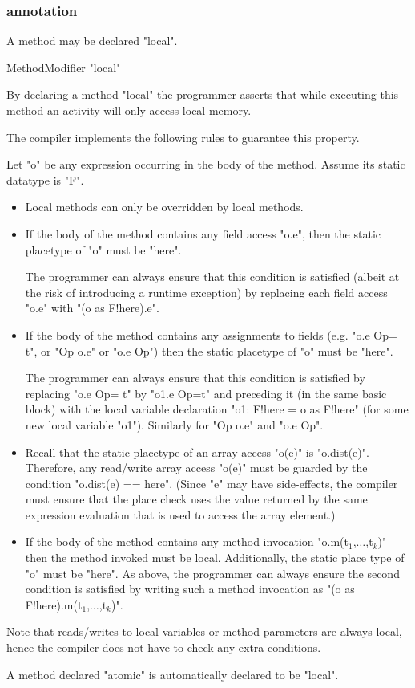 \subsubsection{ annotation}\label{LocalAnnotation}

A method may be declared \xcd"local".

\begin{grammar}
  MethodModifier \: \xcd"local"  
\end{grammar}

By declaring a method \xcd"local" the programmer asserts that while
executing this method an activity will only access local memory.

The compiler implements the following rules to guarantee this property.

Let \xcd"o" be any expression occurring in the body of the
method. Assume its static datatype is \xcd"F". 

\begin{itemize}
\item Local methods can only be overridden by local methods. 

\item If the body of the method contains any field access \xcd"o.e", then
the static placetype of \xcd"o" must be \xcd"here". 

The programmer can always ensure that this condition is satisfied
(albeit at the risk of introducing a runtime exception) by replacing
each field access \xcd"o.e" with \xcd"(o as F!here).e".

\item If the body of the method contains any assignments to fields
(e.g. \xcd"o.e Op= t", or \xcd"Op o.e" or \xcd"o.e Op") then the
static placetype of \xcd"o" must be \xcd"here".

The programmer can always ensure that this condition is satisfied by
replacing \xcd"o.e Op= t" by \xcd"o1.e Op=t" and preceding it (in the
same basic block) with the local variable declaration \xcd"o1: F!here = o as F!here" (for some new local variable \xcd"o1"). Similarly for
\xcd"Op o.e" and \xcd"o.e Op".

\item Recall that the static placetype of an array access \xcd"o(e)"
is \xcd"o.dist(e)". Therefore, any read/write array access
\xcd"o(e)" must be guarded by the condition \xcd"o.dist(e) == here".  (Since  \xcd"e" may have side-effects, the compiler must
ensure that the place check uses the value returned by the same
expression evaluation that is used to access the array element.)

\item If the body of the method contains any method invocation
\xcdmath"o.m(t$_1$,$\dots$,t$_k$)" then the method invoked must be local. Additionally,
the static place type of \xcd"o" must be \xcd"here". 
As above, the programmer can always ensure the second
condition is satisfied by writing such a method invocation
as \xcdmath"(o as F!here).m(t$_1$,$\dots$,t$_k$)".
\end{itemize}

Note that reads/writes to local variables or method parameters are
always local, hence the compiler does not have to check any extra
conditions.

A method declared \xcd"atomic" is automatically declared
to be \xcd"local".
